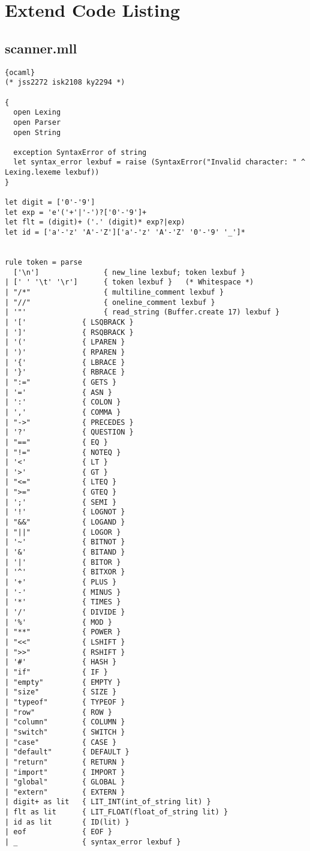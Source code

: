 \chapter{Extend Code Listing}
\section{scanner.mll}
\begin{lstlisting}{ocaml}
(* jss2272 isk2108 ky2294 *)

{
  open Lexing
  open Parser
  open String

  exception SyntaxError of string
  let syntax_error lexbuf = raise (SyntaxError("Invalid character: " ^ Lexing.lexeme lexbuf))
}

let digit = ['0'-'9']
let exp = 'e'('+'|'-')?['0'-'9']+
let flt = (digit)+ ('.' (digit)* exp?|exp)
let id = ['a'-'z' 'A'-'Z']['a'-'z' 'A'-'Z' '0'-'9' '_']*


rule token = parse
  ['\n']               { new_line lexbuf; token lexbuf }
| [' ' '\t' '\r']      { token lexbuf }   (* Whitespace *)
| "/*"                 { multiline_comment lexbuf }
| "//"                 { oneline_comment lexbuf }
| '"'                  { read_string (Buffer.create 17) lexbuf }
| '['             { LSQBRACK }
| ']'             { RSQBRACK }
| '('             { LPAREN }
| ')'             { RPAREN }
| '{'             { LBRACE }
| '}'             { RBRACE }
| ":="            { GETS }
| '='             { ASN }
| ':'             { COLON }
| ','             { COMMA }
| "->"            { PRECEDES }
| '?'             { QUESTION }
| "=="            { EQ }
| "!="            { NOTEQ }
| '<'             { LT }
| '>'             { GT }
| "<="            { LTEQ }
| ">="            { GTEQ }
| ';'             { SEMI }
| '!'             { LOGNOT }
| "&&"            { LOGAND }
| "||"            { LOGOR }
| '~'             { BITNOT }
| '&'             { BITAND }
| '|'             { BITOR }
| '^'             { BITXOR }
| '+'             { PLUS }
| '-'             { MINUS }
| '*'             { TIMES }
| '/'             { DIVIDE }
| '%'             { MOD }
| "**"            { POWER }
| "<<"            { LSHIFT }
| ">>"            { RSHIFT }
| '#'             { HASH }
| "if"            { IF }
| "empty"         { EMPTY }
| "size"          { SIZE }
| "typeof"        { TYPEOF }
| "row"           { ROW }
| "column"        { COLUMN }
| "switch"        { SWITCH }
| "case"          { CASE }
| "default"       { DEFAULT }
| "return"        { RETURN }
| "import"        { IMPORT }
| "global"        { GLOBAL }
| "extern"        { EXTERN }
| digit+ as lit   { LIT_INT(int_of_string lit) }
| flt as lit      { LIT_FLOAT(float_of_string lit) }
| id as lit       { ID(lit) }
| eof             { EOF }
| _               { syntax_error lexbuf }


\end{lstlisting}
